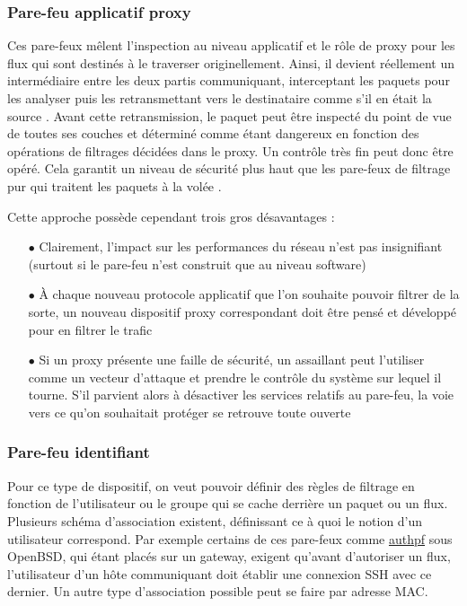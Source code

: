 \documentclass[]{article}
\begin{document}
\subsubsection{Pare-feu applicatif proxy}

Ces pare-feux mêlent l'inspection au niveau applicatif et le rôle de proxy pour les flux qui sont destinés à le traverser originellement. Ainsi, il devient réellement un intermédiaire entre les deux partis communiquant, interceptant les paquets pour les analyser puis les retransmettant vers le destinataire comme s'il en était la source \cite{Shimonski2013}. Avant cette retransmission, le paquet peut être inspecté du point de vue de toutes ses couches et déterminé comme étant dangereux en fonction des opérations de filtrages décidées dans le proxy. Un contrôle très fin peut donc être opéré. Cela garantit un niveau de sécurité plus haut que les pare-feux de filtrage pur qui traitent les paquets à la volée \cite{frameIP}.\\

\par Cette approche possède cependant trois gros désavantages : 
\begin{itemize}
\vspace{0.2cm}
\item[$\bullet$] Clairement, l'impact sur les performances du réseau n'est pas insignifiant (surtout si le pare-feu n'est construit que au niveau software)
\vspace{0.2cm}
\item[$\bullet$] À chaque nouveau protocole applicatif que l'on souhaite pouvoir filtrer de la sorte, un nouveau dispositif proxy correspondant doit être pensé et développé pour en filtrer le trafic
\vspace{0.2cm}
\item[$\bullet$] Si un proxy présente une faille de sécurité, un assaillant peut l'utiliser comme un vecteur d'attaque et prendre le contrôle du système sur lequel il tourne. S'il parvient alors à désactiver les services relatifs au pare-feu, la voie vers ce qu'on souhaitait protéger se retrouve toute ouverte
\end{itemize}


\subsubsection{Pare-feu identifiant}\label{idfw}

Pour ce type de dispositif, on veut pouvoir définir des règles de filtrage en fonction de l'utilisateur ou le groupe qui se cache derrière un paquet ou un flux. Plusieurs schéma d'association existent, définissant ce à quoi le notion d'un utilisateur correspond. Par exemple certains de ces pare-feux comme \href{http://www.openbsd.org/faq/pf/authpf.html}{authpf} sous OpenBSD, qui étant placés sur un gateway, exigent qu'avant d'autoriser un flux, l'utilisateur d'un hôte communiquant doit établir une connexion SSH avec ce dernier. Un autre type d'association possible peut se faire par adresse MAC.\\
\end{document}
